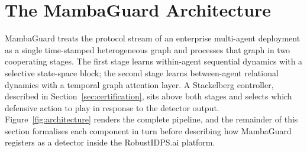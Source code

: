 \documentclass[journal,10pt,twocolumn]{IEEEtran}
\begin{document}
\section{The MambaGuard Architecture}
\label{sec:architecture}

MambaGuard treats the protocol stream of an enterprise multi-agent deployment as a single time-stamped heterogeneous graph and processes that graph in two cooperating stages. The first stage learns within-agent sequential dynamics with a selective state-space block; the second stage learns between-agent relational dynamics with a temporal graph attention layer. A Stackelberg controller, described in Section~\ref{sec:certification}, sits above both stages and selects which defensive action to play in response to the detector output. Figure~\ref{fig:architecture} renders the complete pipeline, and the remainder of this section formalises each component in turn before describing how MambaGuard registers as a detector inside the RobustIDPS.ai platform.
\end{document}
